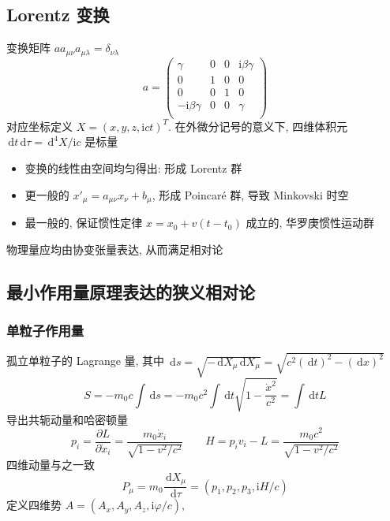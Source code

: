 \documentclass[12pt,a4paper]{article}%
\numberwithin{equation}{section}%
\newcommand{\dif}{\,\mathrm d}
\newcommand\mi{\mathrm{i}}
\begin{document}
\subsection{Lorentz 变换} %
\label{sub:lorentz_trans}
变换矩阵 $aa_{\mu\nu}a_{\mu\lambda} = \delta_{\nu\lambda}$
\begin{equation}
    a = \begin{pmatrix}
        \gamma          & 0 & 0 &\mi\beta\gamma \\
        0 & 1 & 0 & 0 \\
        0 & 0 & 1 & 0 \\
        -\mi\beta\gamma & 0 & 0 &\gamma         \\
    \end{pmatrix}
\end{equation}
对应坐标定义 $X = (x,y,z,\mi ct)^T$. 在外微分记号的意义下, 四维体积元 $\dif t\dif \tau = \dif^4 X /\mi c$ 是标量
\begin{itemize}
    \item 变换的线性由空间均匀得出: 形成 Lorentz 群
    \item 更一般的 $x'_\mu = a_{\mu\nu}x_\nu + b_\mu$, 形成 Poincar\'e 群, 导致 Minkovski 时空
    \item 最一般的, 保证惯性定律 $x = x_0 + v(t-t_0)$ 成立的, 华罗庚惯性运动群
\end{itemize}
物理量应均由协变张量表达, 从而满足相对论
\subsection{最小作用量原理表达的狭义相对论} %
\label{sub:min_action}
\subsubsection{单粒子作用量} %
\label{ssub:single_partical}
孤立单粒子的 Lagrange 量, 其中 $\dif s =\sqrt{-\dif X_\mu\dif X_\mu} = \sqrt{c^2(\dif t)^2 - (\dif x)^2}$ 
\begin{equation}
    S = -m_0c\int\dif s = -m_0c^2\int\dif t\sqrt{1-\frac{\dot x^2}{c^2}} = \int\dif tL
\end{equation}
导出共轭动量和哈密顿量
\begin{equation}
    p_i = \frac{\partial L}{\partial \dot x_i} = \frac{m_0\dot x_i}{\sqrt{1 - v^2/c^2}} \qquad 
    H = p_i v_i - L = \frac{m_0 c^2}{\sqrt{1-v^2/c^2}}
\end{equation}
四维动量与之一致
\begin{equation}
    P_\mu = m_0\frac{\dif X_\mu}{\dif \tau} = (p_1, p_2, p_3, \mi H/c)
\end{equation}
定义四维势 $A = (A_x, A_y, A_z, \mi\varphi/c)$, 
\end{document}
